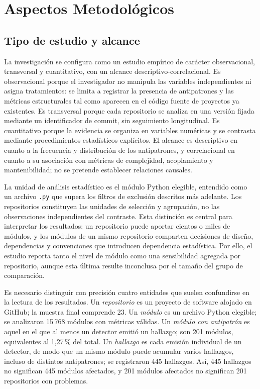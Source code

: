 \section{Aspectos Metodológicos}

\subsection{Tipo de estudio y alcance}

La investigación se configura como un estudio empírico de carácter observacional, transversal y cuantitativo, con un alcance descriptivo-correlacional. Es observacional porque el investigador no manipula las variables independientes ni asigna tratamientos: se limita a registrar la presencia de antipatrones y las métricas estructurales tal como aparecen en el código fuente de proyectos ya existentes. Es transversal porque cada repositorio se analiza en una versión fijada mediante un identificador de commit, sin seguimiento longitudinal. Es cuantitativo porque la evidencia se organiza en variables numéricas y se contrasta mediante procedimientos estadísticos explícitos. El alcance es descriptivo en cuanto a la frecuencia y distribución de los antipatrones, y correlacional en cuanto a su asociación con métricas de complejidad, acoplamiento y mantenibilidad; no se pretende establecer relaciones causales.

La unidad de análisis estadístico es el módulo Python elegible, entendido como un archivo \texttt{.py} que supera los filtros de exclusión descritos más adelante. Los repositorios constituyen las unidades de selección y agrupación, no las observaciones independientes del contraste. Esta distinción es central para interpretar los resultados: un repositorio puede aportar cientos o miles de módulos, y los módulos de un mismo repositorio comparten decisiones de diseño, dependencias y convenciones que introducen dependencia estadística. Por ello, el estudio reporta tanto el nivel de módulo como una sensibilidad agregada por repositorio, aunque esta última resulte inconclusa por el tamaño del grupo de comparación.

Es necesario distinguir con precisión cuatro entidades que suelen confundirse en la lectura de los resultados. Un \emph{repositorio} es un proyecto de software alojado en GitHub; la muestra final comprende 23. Un \emph{módulo} es un archivo Python elegible; se analizaron 15\,768 módulos con métricas válidas. Un \emph{módulo con antipatrón} es aquel en el que al menos un detector emitió un hallazgo; son 201 módulos, equivalentes al 1,27\,\% del total. Un \emph{hallazgo} es cada emisión individual de un detector, de modo que un mismo módulo puede acumular varios hallazgos, incluso de distintos antipatrones; se registraron 445 hallazgos. Así, 445 hallazgos no significan 445 módulos afectados, y 201 módulos afectados no significan 201 repositorios con problemas.

